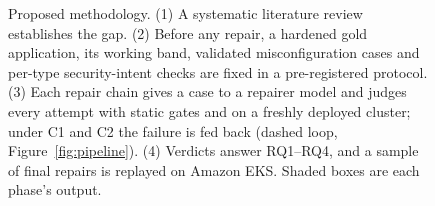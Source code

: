 \begin{figure}[t]
\caption{Proposed methodology. (1) A systematic literature review establishes the gap. (2) Before any repair, a hardened
gold application, its working band, validated misconfiguration cases and per-type security-intent checks are fixed in a
pre-registered protocol. (3) Each repair chain gives a case to a repairer model and judges every attempt with static
gates and on a freshly deployed cluster; under C1 and C2 the failure is fed back (dashed loop, Figure~\ref{fig:pipeline}).
(4) Verdicts answer RQ1--RQ4, and a sample of final repairs is replayed on Amazon EKS. Shaded boxes are each phase's
output.}
\label{fig:method}
\end{figure}
